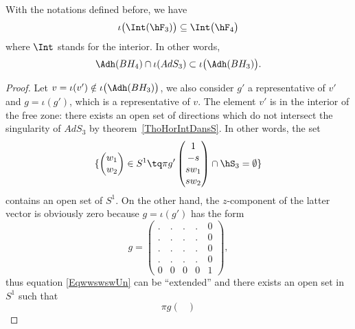 	\begin{lemma}		\label{LemIntTroisQueatr}
		With the notations defined before, we have
		\begin{equation}
			\iota\big( \Int(\hF_3) \big)\subseteq \Int\big( \hF_4 \big)
		\end{equation}
		where $\Int$ stands for the interior. In other words,
		\begin{equation}
			\Adh(BH_4)\cap\iota(AdS_3)\subset\iota\big( \Adh(BH_3) \big).
		\end{equation}
	\end{lemma}

	\begin{proof}

		Let $v=\iota(v')\notin\iota\big( \Adh(BH_3) \big)$, we also consider $g'$ a representative of $v'$ and $g=\iota(g')$, which is a representative of $v$. The element $v'$ is in the interior of the free zone: there exists an open set of directions which do not intersect the singularity of $AdS_3$ by theorem~\ref{ThoHorIntDansS}. In other words, the set
		\begin{equation}		\label{EqwwswswUn}
			\{ \begin{pmatrix}
				w_1 \\
				w_2
			\end{pmatrix}\in S^1\tq
			\pi g'\begin{pmatrix}
				1    \\
				-s   \\
				sw_1 \\
				sw_2
			\end{pmatrix}\cap\hS_3 =\emptyset\}
		\end{equation}
		contains an open set of $S^1$. On the other hand, the $z$-component of the latter vector is obviously zero because $g=\iota(g')$ has the form
		\begin{equation}
			g=\begin{pmatrix}
				. & . & . & . & 0 \\
				. & . & . & . & 0 \\
				. & . & . & . & 0 \\
				. & . & . & . & 0 \\
				0 & 0 & 0 & 0 & 1
			\end{pmatrix},
		\end{equation}
		thus equation \eqref{EqwwswswUn} can be ``extended'' and there exists an open set in $S^1$ such that
		\begin{equation}
			\pi g\begin{pmatrix}

\end{pmatrix}
\end{equation}
\end{proof}
